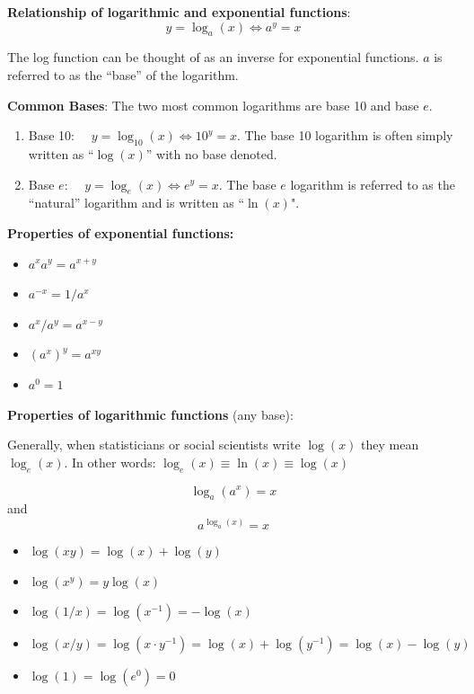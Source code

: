 \documentclass[]{book}
\providecommand{\tightlist}{%
  \setlength{\itemsep}{0pt}\setlength{\parskip}{0pt}}
\theoremstyle{definition}
\theoremstyle{definition}
\theoremstyle{definition}
\theoremstyle{remark}
\begin{document}
\textbf{Relationship of logarithmic and exponential functions}:
\[y=\log_a(x) \iff a^y=x\]

The log function can be thought of as an inverse for exponential functions. \(a\) is referred to as the ``base'' of the logarithm.

\textbf{Common Bases}: The two most common logarithms are base 10 and base \(e\).

\begin{enumerate}
\def\labelenumi{\arabic{enumi}.}
\tightlist
\item
  Base 10: \(\quad y=\log_{10}(x) \iff 10^y=x\). The base 10 logarithm is often simply written as ``\(\log(x)\)'' with no base denoted.
\item
  Base \(e\): \(\quad y=\log_e(x) \iff e^y=x\). The base \(e\) logarithm is referred to as the ``natural'' logarithm and is written as ``\(\ln(x)\)".
\end{enumerate}

\textbf{Properties of exponential functions:}

\begin{itemize}
\tightlist
\item
  \(a^x a^y = a^{x+y}\)
\item
  \(a^{-x} = 1/a^x\)
\item
  \(a^x/a^y = a^{x-y}\)
\item
  \((a^x)^y = a^{x y}\)
\item
  \(a^0 = 1\)
\end{itemize}

\textbf{Properties of logarithmic functions} (any base):

Generally, when statisticians or social scientists write \(\log(x)\) they mean \(\log_e(x)\). In other words: \(\log_e(x) \equiv \ln(x) \equiv \log(x)\)

\[\log_a(a^x)=x\] and
\[a^{\log_a(x)}=x\]

\begin{itemize}
\tightlist
\item
  \(\log(x y)=\log(x)+\log(y)\)
\item
  \(\log(x^y)=y\log(x)\)
\item
  \(\log(1/x)=\log(x^{-1})=-\log(x)\)
\item
  \(\log(x/y)=\log(x\cdot y^{-1})=\log(x)+\log(y^{-1})=\log(x)-\log(y)\)
\item
  \(\log(1)=\log(e^0)=0\)
\end{itemize}
\end{document}
